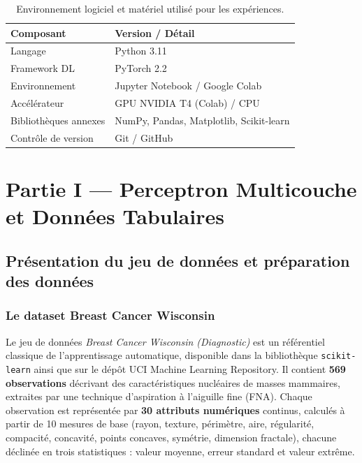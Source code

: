 \documentclass[11pt,a4paper]{article}
\begin{document}
\begin{table}[H]
  \centering
  \caption{Environnement logiciel et matériel utilisé pour les expériences.}
  \label{tab:env_dev}
  \begin{tabular}{ll}
    \toprule
    \textbf{Composant}    & \textbf{Version / Détail}     \\
    \midrule
    Langage               & Python 3.11                   \\
    Framework DL          & PyTorch 2.2                   \\
    Environnement         & Jupyter Notebook / Google Colab \\
    Accélérateur          & GPU NVIDIA T4 (Colab) / CPU   \\
    Bibliothèques annexes & NumPy, Pandas, Matplotlib, Scikit-learn \\
    Contrôle de version   & Git / GitHub                  \\
    \bottomrule
  \end{tabular}
\end{table}


\section{Partie I — Perceptron Multicouche et Données Tabulaires}

\subsection{Présentation du jeu de données et préparation des données}

\subsubsection{Le dataset Breast Cancer Wisconsin}

Le jeu de données \textit{Breast Cancer Wisconsin (Diagnostic)} est un référentiel
classique de l'apprentissage automatique, disponible dans la bibliothèque
\texttt{scikit-learn} ainsi que sur le dépôt UCI Machine Learning Repository.
Il contient \textbf{569 observations} décrivant des caractéristiques nucléaires de
masses mammaires, extraites par une technique d'aspiration à l'aiguille fine (FNA).
Chaque observation est représentée par \textbf{30 attributs numériques} continus,
calculés à partir de 10 mesures de base (rayon, texture, périmètre, aire, régularité,
compacité, concavité, points concaves, symétrie, dimension fractale), chacune déclinée
en trois statistiques : valeur moyenne, erreur standard et valeur extrême.
\end{document}
